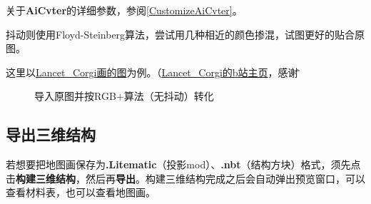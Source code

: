 \documentclass[UTF8]{ctexart}
\begin{document}
关于\textbf{AiCvter}的详细参数，参阅\ref{CustomizeAiCvter}。

抖动则使用Floyd-Steinberg算法，尝试用几种相近的颜色掺混，试图更好的贴合原图。

这里以\href{https://t.bilibili.com/544583492149793294}{Lancet\_Corgi画的图}为例。（\href{https://space.bilibili.com/37171000}{Lancet\_Corgi的b站主页}，感谢\~）

\begin{figure}[htbp]
    \centering
    \setcounter{subfigure}{0}
    \caption{导入原图并按RGB+算法（无抖动）转化}
\end{figure}

\subsection{导出三维结构}
若想要把地图画保存为\textbf{.Litematic}（投影mod）、\textbf{.nbt}（结构方块）格式，须先点击\textbf{构建三维结构}，然后再\textbf{导出}。构建三维结构完成之后会自动弹出预览窗口，可以查看材料表，也可以查看地图画。
\end{document}
